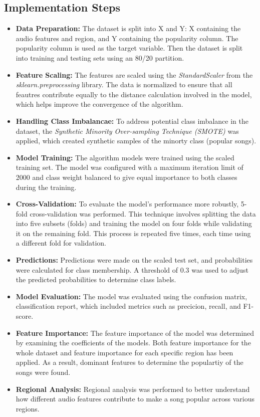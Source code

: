 \subsection{Implementation Steps}
\begin{itemize}
    \item \textbf{Data Preparation: } The dataset is split into X and Y: X containing the audio features and region, and Y containing the popularity column.
    The popularity column is used as the target variable. Then the dataset is split into training and testing sets using an 80/20 partition.
    \item \textbf{Feature Scaling: } The features are scaled using the \textit{StandardScaler} from the \textit{sklearn.preprocessing} library. The data is normalized to ensure that all feautres contribute equally to the distance calculation involved in the model, which helps improve the convergence of the algorithm.
    \item \textbf{Handling Class Imbalancae: } To address potential class imbalance in the dataset, the \textit{Synthetic Minority Over-sampling Technique (SMOTE)} was applied, which
    created synthetic samples of the minorty class (popular songs). 
    \item \textbf{Model Training: } The algorithm models were trained using the scaled training set. The model was
    configured with a maximum iteration limit of 2000 and class weight balanced to give equal importance to both classes during the training.
    \item \textbf{Cross-Validation: } To evaluate the model's performance more robustly, 5-fold cross-validation was performed.
    This technique involves splitting the data into five subsets (folds) and training the model on four folds while validating it on the remaining
    fold. This process is repeated five times, each time using a different fold for validation.
    \item \textbf{Predictions: } Predictions were made on the scaled test set, and probabilities were calculated for class membership. A threshold of 0.3 was used to adjust the predicted probabilities to determine class labels.
    \item \textbf{Model Evaluation: } The model was evaluated using the confusion matrix, classification report, which included metrics such as precicion, recall, and F1-score.
    \item \textbf{Feature Importance: } The feature importance of the model was determined by examining the coefficients of the models. Both feature importance for the whole dataset and feature importance for each specific region has been applied. As a result, dominant features to determine the populartiy of the songs were found.
    \item \textbf{Regional Analysis: } Regional analysis was performed to better understand how different audio features contribute to make a song popular across various regions.
\end{itemize} 



